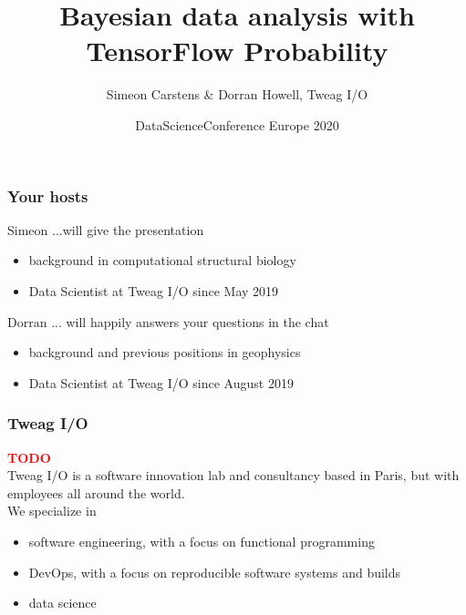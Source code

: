 \documentclass[t]{beamer}
\title{Bayesian data analysis with TensorFlow Probability}
\date{DataScienceConference Europe 2020}
\author{Simeon Carstens \& Dorran Howell, Tweag I/O}
\newcommand{\todo}{\textcolor{red}{\textbf{TODO}}}
\begin{document}
\begin{frame}
  \titlepage
\end{frame}


\begin{frame}
  \frametitle{Your hosts}
  \begin{block}{Simeon}
     ...will give the presentation \\
    \begin{itemize}
    \item background in computational structural biology
    \item Data Scientist at Tweag I/O since May 2019
    \end{itemize}
  \end{block}
  \begin{block}{Dorran}
     ... will happily answers your questions in the chat\\
    \begin{itemize}
    \item background and previous positions in geophysics
    \item Data Scientist at Tweag I/O since August 2019
    \end{itemize}
  \end{block}
\end{frame}


\begin{frame}
  \frametitle{Tweag I/O}
  \todo \\
  Tweag I/O is a software innovation lab and consultancy based in Paris, but with employees all around the world.\\
  We specialize in
  \begin{itemize}
  \item software engineering, with a focus on functional programming
  \item DevOps, with a focus on reproducible software systems and builds
  \item data science
  \end{itemize}
\end{frame}
\end{document}
